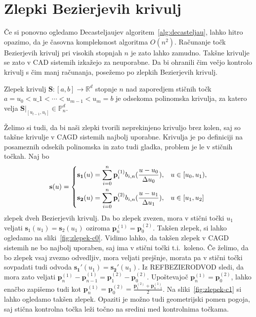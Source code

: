 \documentclass[isrm2, tisk]{fmfdelo}
\newcommand{\R}{\mathbb R}
\newcommand{\Pn}{\mathbb P_n}
\newcommand{\p}{\textbf{p}}
\begin{document}
    \section{Zlepki Bezierjevih krivulj}
    Če si ponovno ogledamo Decasteljaujev algoritem~\ref{alg:decasteljau}, lahko hitro opazimo, da je časovna kompleksnost algoritma $O(n^2)$.
    Računanje točk Bezierjevih krivulj pri visokih stopnjah $n$ je zato lahko zamudno.
    Takšne krivulje se zato v CAD sistemih izkažejo za neuporabne.
    Da bi ohranili čim večjo kontrolo krivulj s čim manj računanja, posežemo po zlepkih Bezierjevih krivulj.
    \begin{definicija}
        Zlepek krivulj  $\mathbf{S}:[a,b]\to \R^d$ stopnje $n$ nad zaporedjem stičnih točk $a=u_0 < u\_1 < \cdots < u_{m-1} < u_m = b$
        je odsekoma polinomska krivulja, za katero velja $\mathbf{S}|_{[u_{l-1},u_l]} \in \Pn^d$.
    \end{definicija}
    Želimo si tudi, da bi naši zlepki tvorili neprekinjeno krivuljo brez kolen, saj so takšne krivulje v CAGD sistemih najbolj uporabne.
    Krivulja je po definiciji na posameznih odsekih polinomska in zato tudi gladka, problem je le v stičnih točkah.
    Naj bo
    \[\mathbf{s}(u) = \begin{dcases}
                          \mathbf{s_1}(u) = \sum_{i=0}^n \p_i^{(1)}b_{i,n}(\frac{u-u_0}{\Delta u_0}), & u \in [u_0,u_1),  \\
                          \mathbf{s_2}(u) = \sum_{i=0}^n \p_i^{(2)}b_{i,n}(\frac{u-u_1}{\Delta u_1}), & u \in [u_1,u_2]
    \end{dcases}\]
    zlepek dveh Bezierjevih krivulj.
    Da bo zlepek zvezen, mora v stični točki $u_1$ veljati $\mathbf{s}_1(u_1) = \mathbf{s}_2(u_1)$ oziroma $\p_n^{(1)} = \p_0^{(2)}$.
    Takšen zlepek, si lahko ogledamo na sliki~\ref{fig:zlepek-c0}.
    Vidimo lahko, da takšen zlepek v CAGD sistemih ne bo najbolj uporaben, saj ima v stični točki t.i.\ koleno.
    Če želimo, da bo zlepek vsaj zvezno odvedljiv, mora veljati prejšnje, morata pa v stični točki sovpadati tudi odvoda $\mathbf{s_1}'(u_1) = \mathbf{s_2}'(u_1)$.
    Iz REFBEZIERODVOD sledi, da mora zato veljati $\p_{n}^{(1)} - \p_{n-1}^{(1)} = \p_{1}^{(2)} - \p_{0}^{(2)}$.
    Upoštevajoč $\p_n^{(1)} = \p_0^{(2)}$, lahko enačbo zapišemo tudi kot $\p_{n}^{(1)} =  \p_{0}^{(2)}  = \frac{\p_{1}^{(2)}+ \p_{n-1}^{(1)}}{2}$.
    Na sliki~\ref{fig:zlepek-c1} si lahko ogledamo takšen zlepek.
    Opaziti je možno tudi geometrijski pomen pogoja, saj stična kontrolna točka leži točno na sredini med kontrolnima točkama.
\end{document}

